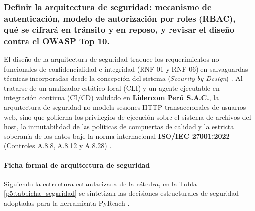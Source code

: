 \subsubsection{Definir la arquitectura de seguridad: mecanismo de autenticación, modelo de autorización por roles (RBAC), qué se cifrará en tránsito y en reposo, y revisar el diseño contra el OWASP Top 10.}
El diseño de la arquitectura de seguridad traduce los requerimientos no funcionales de confidencialidad e integridad (RNF-01 y RNF-06) en salvaguardas técnicas incorporadas desde la concepción del sistema (\textit{Security by Design}) \cite{pressman2020software, torres2026proyecto}. Al tratarse de un analizador estático local (CLI) y un agente ejecutable en integración continua (CI/CD) validado en \textbf{Lidercom Perú S.A.C.}, la arquitectura de seguridad no modela sesiones HTTP transaccionales de usuarios web, sino que gobierna los privilegios de ejecución sobre el sistema de archivos del host, la inmutabilidad de las políticas de compuertas de calidad y la estricta soberanía de los datos bajo la norma internacional \textbf{ISO/IEC 27001:2022} (Controles A.8.8, A.8.12 y A.8.28) \cite{ladisa2023sok, gutierrez2024auditoria}.

\paragraph*{Ficha formal de arquitectura de seguridad}
Siguiendo la estructura estandarizada de la cátedra, en la Tabla \ref{p5:tab:ficha_seguridad} se sintetizan las decisiones estructurales de seguridad adoptadas para la herramienta PyReach \cite{torres2026proyecto}.

